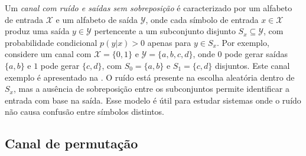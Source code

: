 Um \emph{canal com ruído e saídas sem sobreposição} é caracterizado por um alfabeto de
entrada $\mathcal{X}$ e um alfabeto de saída $\mathcal{Y}$, onde cada símbolo de entrada $x \in \mathcal{X}$
produz uma saída $y \in \mathcal{Y}$ pertencente a um subconjunto disjunto $S_x \subseteq \mathcal{Y}$,
com probabilidade condicional $p(y|x) > 0$ apenas para $y \in S_x$. Por
exemplo, considere um canal com $\mathcal{X} = \{0, 1\}$ e $\mathcal{Y} = \{a, b, c, d\}$, 
onde $0$ pode gerar saídas $\{a, b\}$ e $1$ pode gerar $\{c, d\}$, com $S_0 = \{a, b\}$ e $S_1 = \{c, d\}$
disjuntos. Este canal exemplo é apresentado na .
O ruído está presente na escolha aleatória dentro de $S_x$, mas a
ausência de sobreposição entre os subconjuntos permite identificar a entrada
com base na saída. Esse modelo é útil para estudar sistemas onde o ruído não
causa confusão entre símbolos distintos.




\subsection{Canal de permutação}

\begin{marginfigure}%
  \centering
  \caption{Exemplo de canal de permutação.}\label{fig:canalperm}
\end{marginfigure}

